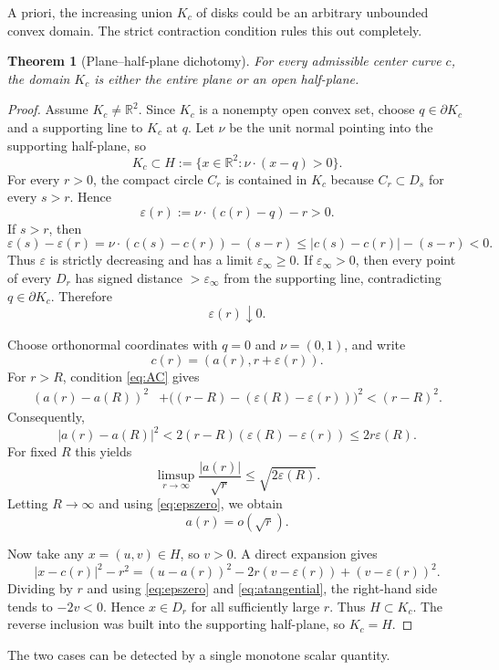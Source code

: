 \documentclass[11pt]{article}
\newtheorem{theorem}{Theorem}[section]
\newcommand{\R}{\mathbb{R}}
\begin{document}
A priori, the increasing union $K_c$ of disks could be an arbitrary unbounded convex domain. The strict contraction condition rules this out completely.

\begin{theorem}[Plane--half-plane dichotomy]\label{thm:dichotomy}
For every admissible center curve $c$, the domain $K_c$ is either the entire plane or an open half-plane.
\end{theorem}

\begin{proof}
Assume $K_c\ne\R^2$. Since $K_c$ is a nonempty open convex set, choose $q\in\partial K_c$ and a supporting line to $K_c$ at $q$. Let $\nu$ be the unit normal pointing into the supporting half-plane, so
\[
K_c\subset H:=\{x\in\R^2:\nu\cdot(x-q)>0\}.
\]
For every $r>0$, the compact circle $C_r$ is contained in $K_c$ because $C_r\subset D_s$ for every $s>r$. Hence
\[
\varepsilon(r):=\nu\cdot(c(r)-q)-r>0.
\]
If $s>r$, then
\[
\varepsilon(s)-\varepsilon(r)
=\nu\cdot(c(s)-c(r))-(s-r)
\le |c(s)-c(r)|-(s-r)<0.
\]
Thus $\varepsilon$ is strictly decreasing and has a limit $\varepsilon_\infty\ge0$. If $\varepsilon_\infty>0$, then every point of every $D_r$ has signed distance $>\varepsilon_\infty$ from the supporting line, contradicting $q\in\partial K_c$. Therefore
\[
\varepsilon(r)\downarrow0.
\tag{5.1}\label{eq:epszero}
\]

Choose orthonormal coordinates with $q=0$ and $\nu=(0,1)$, and write
\[
c(r)=(a(r),r+\varepsilon(r)).
\]
For $r>R$, condition \eqref{eq:AC} gives
\begin{align*}
(a(r)-a(R))^2
&+\bigl((r-R)-(\varepsilon(R)-\varepsilon(r))\bigr)^2
<(r-R)^2.
\end{align*}
Consequently,
\[
|a(r)-a(R)|^2
<2(r-R)(\varepsilon(R)-\varepsilon(r))
\le 2r\varepsilon(R).
\]
For fixed $R$ this yields
\[
\limsup_{r\to\infty}\frac{|a(r)|}{\sqrt r}
\le\sqrt{2\varepsilon(R)}.
\]
Letting $R\to\infty$ and using \eqref{eq:epszero}, we obtain
\[
a(r)=o(\sqrt r).
\tag{5.2}\label{eq:atangential}
\]

Now take any $x=(u,v)\in H$, so $v>0$. A direct expansion gives
\[
|x-c(r)|^2-r^2
=(u-a(r))^2-2r(v-\varepsilon(r))+(v-\varepsilon(r))^2.
\]
Dividing by $r$ and using \eqref{eq:epszero} and \eqref{eq:atangential}, the right-hand side tends to $-2v<0$. Hence $x\in D_r$ for all sufficiently large $r$. Thus $H\subset K_c$. The reverse inclusion was built into the supporting half-plane, so $K_c=H$.
\end{proof}

The two cases can be detected by a single monotone scalar quantity.
\end{document}
